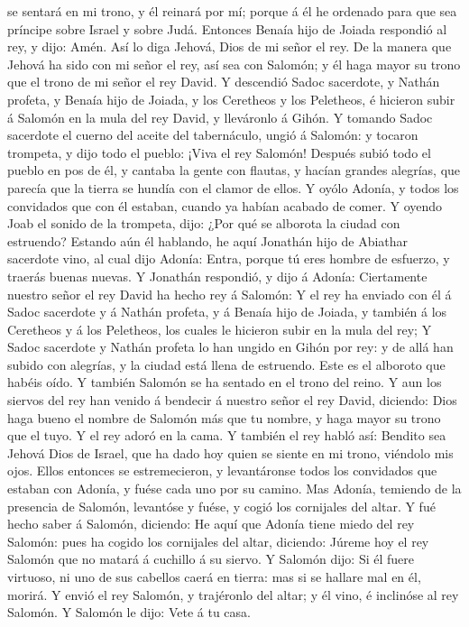 se sentará en mi trono, y él reinará por mí; porque á él he ordenado
para que sea príncipe sobre Israel y sobre Judá.  Entonces
Benaía hijo de Joiada respondió al rey, y dijo: Amén. Así lo diga
Jehová, Dios de mi señor el rey.  De la manera que Jehová
ha sido con mi señor el rey, así sea con Salomón; y él haga mayor su
trono que el trono de mi señor el rey David.  Y descendió
Sadoc sacerdote, y Nathán profeta, y Benaía hijo de Joiada, y los
Ceretheos y los Peletheos, é hicieron subir á Salomón en la mula del rey
David, y lleváronlo á Gihón.  Y tomando Sadoc sacerdote el
cuerno del aceite del tabernáculo, ungió á Salomón: y tocaron trompeta,
y dijo todo el pueblo: ¡Viva el rey Salomón!  Después subió
todo el pueblo en pos de él, y cantaba la gente con flautas, y hacían
grandes alegrías, que parecía que la tierra se hundía con el clamor de
ellos.  Y oyólo Adonía, y todos los convidados que con él
estaban, cuando ya habían acabado de comer. Y oyendo Joab el sonido de
la trompeta, dijo: ¿Por qué se alborota la ciudad con estruendo?
 Estando aún él hablando, he aquí Jonathán hijo de Abiathar
sacerdote vino, al cual dijo Adonía: Entra, porque tú eres hombre de
esfuerzo, y traerás buenas nuevas.  Y Jonathán respondió, y
dijo á Adonía: Ciertamente nuestro señor el rey David ha hecho rey á
Salomón:  Y el rey ha enviado con él á Sadoc sacerdote y á
Nathán profeta, y á Benaía hijo de Joiada, y también á los Ceretheos y á
los Peletheos, los cuales le hicieron subir en la mula del rey;
 Y Sadoc sacerdote y Nathán profeta lo han ungido en Gihón
por rey: y de allá han subido con alegrías, y la ciudad está llena de
estruendo. Este es el alboroto que habéis oído.  Y también
Salomón se ha sentado en el trono del reino.  Y aun los
siervos del rey han venido á bendecir á nuestro señor el rey David,
diciendo: Dios haga bueno el nombre de Salomón más que tu nombre, y haga
mayor su trono que el tuyo. Y el rey adoró en la cama.  Y
también el rey habló así: Bendito sea Jehová Dios de Israel, que ha dado
hoy quien se siente en mi trono, viéndolo mis ojos.  Ellos
entonces se estremecieron, y levantáronse todos los convidados que
estaban con Adonía, y fuése cada uno por su camino.  Mas
Adonía, temiendo de la presencia de Salomón, levantóse y fuése, y cogió
los cornijales del altar.  Y fué hecho saber á Salomón,
diciendo: He aquí que Adonía tiene miedo del rey Salomón: pues ha cogido
los cornijales del altar, diciendo: Júreme hoy el rey Salomón que no
matará á cuchillo á su siervo.  Y Salomón dijo: Si él fuere
virtuoso, ni uno de sus cabellos caerá en tierra: mas si se hallare mal
en él, morirá.  Y envió el rey Salomón, y trajéronlo del
altar; y él vino, é inclinóse al rey Salomón. Y Salomón le dijo: Vete á
tu casa.

